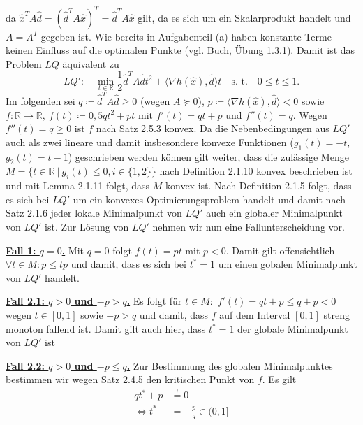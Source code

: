 \documentclass[ngerman, a4paper,12pt]{article}
\begin{document}
da $\hat{x}^TA\hat{d} = (\hat{d}^TA\hat{x})^T =  \hat{d}^TA\hat{x}$ gilt, da es sich um ein Skalarprodukt handelt und $A=A^T$ gegeben ist. Wie bereits in Aufgabenteil (a) haben konstante Terme keinen Einfluss auf die optimalen Punkte (vgl. Buch, Übung 1.3.1). Damit ist das Problem $LQ$ äquivalent zu
\begin{equation*}
	LQ': \quad \min_{t \in \mathbb{R}} \frac{1}{2} \hat{d}^TA\hat{d}t^2 + \langle \nabla h(\hat{x}), \hat{d} \rangle t \quad \text{s. t.} \quad 0\leq t \leq 1.
\end{equation*}
Im folgenden sei $q \coloneqq \hat{d}^TA\hat{d}\geq 0$ (wegen $A \succeq 0$), $p \coloneqq \langle \nabla h(\hat{x}), \hat{d} \rangle < 0$ sowie $f: \mathbb{R} \rightarrow \mathbb{R}, \ f(t) \coloneqq 0,5qt^2+pt$ mit $f'(t)=qt+p$ und $f''(t)=q$. Wegen $f''(t)=q\geq 0$ ist $f$ nach Satz 2.5.3 konvex. Da die Nebenbedingungen aus $LQ'$ auch als zwei lineare und damit insbesondere konvexe Funktionen ($g_1(t)=-t$, $g_2(t)=t-1$) geschrieben werden können gilt weiter, dass die zulässige Menge $M = \{t \in \mathbb{R} \ | \ g_i(t) \leq 0, i\in \{1,2\} \}$ nach Definition 2.1.10 konvex beschrieben ist und mit Lemma 2.1.11 folgt, dass $M$ konvex ist. Nach Definition 2.1.5 folgt, dass es sich bei $LQ'$ um ein konvexes Optimierungsproblem handelt und damit nach Satz 2.1.6 jeder lokale Minimalpunkt von $LQ'$ auch ein globaler Minimalpunkt von $LQ'$ ist. Zur Lösung von $LQ'$ nehmen wir nun eine Fallunterscheidung vor. \par
\textbf{\underline{Fall 1: $q = 0$.}}
Mit $q=0$ folgt $f(t)=pt$ mit $p<0$. Damit gilt offensichtlich $\forall t \in M: p \leq tp$ und damit, dass es sich bei $t^*=1$ um einen gobalen Minimalpunkt von $LQ'$ handelt. \par
\textbf{\underline{Fall 2.1: $q > 0$ und $-p > q$.}} Es folgt für $t \in M:$ $f'(t)=qt+p \leq q+p < 0$ wegen $t \in [0,1]$ sowie $-p > q$ und damit, dass $f$ auf dem Interval $[0,1]$ streng monoton fallend ist. Damit gilt auch hier, dass $t^*=1$ der globale Minimalpunkt von $LQ'$ ist %
\par
\textbf{\underline{Fall 2.2: $q > 0$ und $-p \leq q$.}} Zur Bestimmung des globalen Minimalpunktes bestimmen wir wegen Satz 2.4.5 den kritischen Punkt von $f$. Es gilt
\begin{equation*}
	\begin{split}
		qt^*+p &\stackrel{!}{=} 0 \\
	\Leftrightarrow	t^* &= -\frac{p}{q} \in (0,1]
	\end{split}
\end{equation*}
\end{document}
